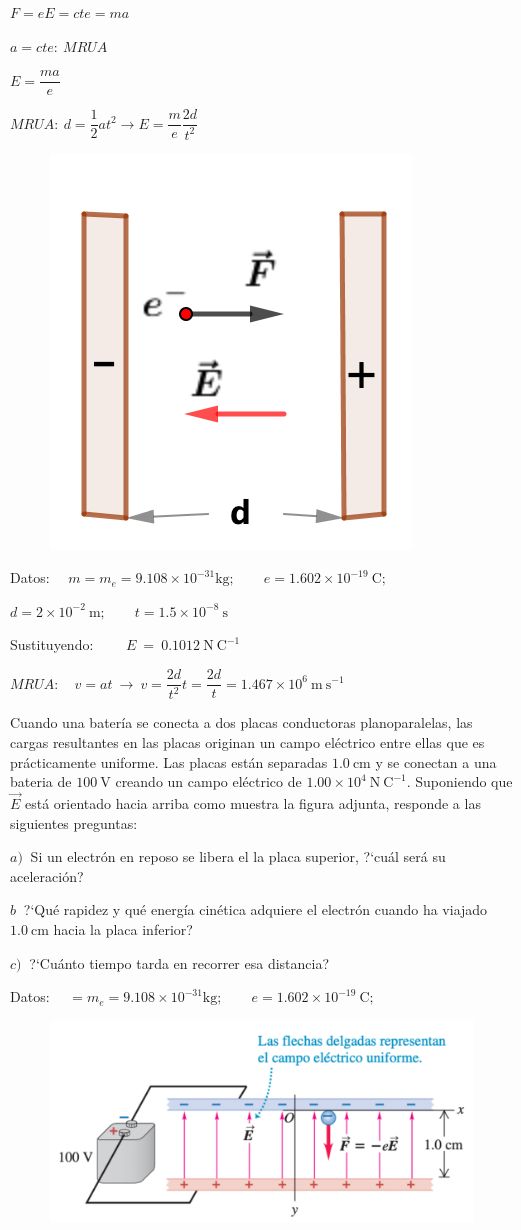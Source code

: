 \begin{multicols}{2}
$F=eE=cte=ma$ 

$a=cte:\ MRUA$

$E=\dfrac{ma}{e}$

$MRUA:\ d=\dfrac 1 2 a t^2 \to E=\dfrac me \dfrac {2d}{t^2}$
\begin{figure}[H]
	\centering
	\includegraphics[width=.2\textwidth]{imagenes/imagenes22/T22IM16.png}
\end{figure}		
\end{multicols}

Datos: $\quad m=m_e=9.108\times 10^{-31} \mathrm{kg};\qquad  e=1.602\times 10^{-19}\ \mathrm{C}; \qquad  $

$d=2\times 10^{-2} \ \mathrm{m}; \qquad t=1.5\times 10^{-8}\ \mathrm{s}$

Sustituyendo: $\qquad E\ = \ 0.1012 \ \mathrm{N \ C}^{-1}$

$MRUA: \quad v=at \ \to \ v=\dfrac{2d}{t^2}t=\dfrac{2d}{t}= 1.467\times 10^6 \ \mathrm{m\ s}^{-1}$


\begin{prob}
Cuando una batería se conecta a dos placas conductoras planoparalelas, las cargas resultantes en las placas originan un campo eléctrico entre ellas que es prácticamente uniforme. Las placas están separadas $1.0\ \mathrm{cm}$ y se conectan a una bateria de $100\ \mathrm{V}$ creando un campo eléctrico de $1.00\times 10^4\ \mathrm{N\ C}^{-1}$. Suponiendo que $\vec E$ está orientado hacia arriba como muestra la figura adjunta, responde a las siguientes preguntas:

$a)\ $ Si un electrón en reposo se libera el la placa superior, ?`cuál será su aceleración?

$b \ $ ?`Qué rapidez y qué energía cinética adquiere el electrón cuando ha viajado $1.0\ \mathrm{cm}$ hacia la placa inferior?

$c)\ $ ?`Cuánto tiempo tarda en recorrer esa distancia?

Datos: $\quad =m_e=9.108\times 10^{-31} \mathrm{kg};\qquad  e=1.602\times 10^{-19}\ \mathrm{C}; \qquad  $

\begin{figure}[H]
	\centering
	\includegraphics[width=.9\textwidth]{imagenes/imagenes22/T22IM19.png}
\end{figure}
\end{prob}

